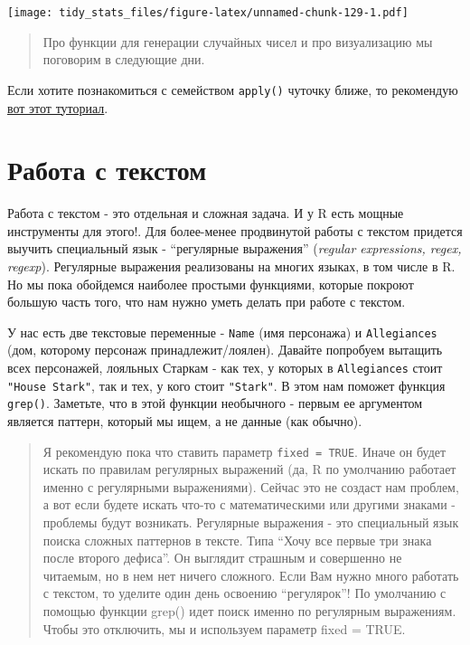 \documentclass[]{book}
\begin{document}
\texttt{[image: tidy\_stats\_files/figure-latex/unnamed-chunk-129-1.pdf]}

\begin{quote}
Про функции для генерации случайных чисел и про визуализацию мы
поговорим в следующие дни.
\end{quote}

Если хотите познакомиться с семейством \texttt{apply()} чуточку ближе,
то рекомендую
\href{https://www.datacamp.com/community/tutorials/r-tutorial-apply-family}{вот
этот туториал}.

\section{Работа с текстом}\label{text}

Работа с текстом - это отдельная и сложная задача. И у R есть мощные
инструменты для этого!. Для более-менее продвинутой работы с текстом
придется выучить специальный язык - ``регулярные выражения''
(\emph{regular expressions, regex, regexp}). Регулярные выражения
реализованы на многих языках, в том числе в R. Но мы пока обойдемся
наиболее простыми функциями, которые покроют большую часть того, что нам
нужно уметь делать при работе с текстом.

У нас есть две текстовые переменные - \texttt{Name} (имя персонажа) и
\texttt{Allegiances} (дом, которому персонаж принадлежит/лоялен).
Давайте попробуем вытащить всех персонажей, лояльных Старкам - как тех,
у которых в \texttt{Allegiances} стоит \texttt{"House\ Stark"}, так и
тех, у кого стоит \texttt{"Stark"}. В этом нам поможет функция
\texttt{grep()}. Заметьте, что в этой функции необычного - первым ее
аргументом является паттерн, который мы ищем, а не данные (как обычно).

\begin{quote}
Я рекомендую пока что ставить параметр \texttt{fixed\ =\ TRUE}. Иначе он
будет искать по правилам регулярных выражений (да, R по умолчанию
работает именно с регулярными выражениями). Сейчас это не создаст нам
проблем, а вот если будете искать что-то с математическими или другими
знаками - проблемы будут возникать. Регулярные выражения - это
специальный язык поиска сложных паттернов в тексте. Типа ``Хочу все
первые три знака после второго дефиса''. Он выглядит страшным и
совершенно не читаемым, но в нем нет ничего сложного. Если Вам нужно
много работать с текстом, то уделите один день освоению ``регулярок''!
По умолчанию с помощью функции grep() идет поиск именно по регулярным
выражениям. Чтобы это отключить, мы и используем параметр fixed = TRUE.
\end{quote}
\end{document}
